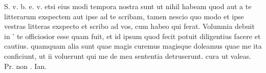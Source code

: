 


S. v. b. e. v. etsi eius modi tempora nostra sunt ut nihil habeam quod aut a te litterarum exspectem aut ipse ad te scribam, tamen nescio quo modo et ipse vestras
litteras exspecto et scribo ad vos, cum habeo qui ferat.
Volumnia debuit in ' te officiosior esse quam fuit, et id ipsum quod fecit potuit diligentius facere et cautius. quamquam alia sunt quae magis curemus magisque doleamus quae me ita conficiunt, ut ii voluerunt qui me de mea
sententia detruserunt. cura ut valeas. Pr. non . Ian.
